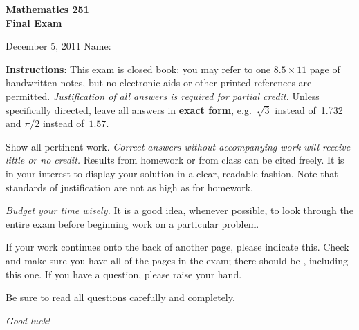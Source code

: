 \documentclass[12pt]{exam}
\begin{document}
\addpoints

\noindent
\textbf{{\large Mathematics 251 \\ Final Exam}}

\noindent
December 5, 2011  \hfill Name: \underline{\hspace{3in}}

\noindent
\textbf{Instructions}: This exam is closed book: you may refer to one $8.5 \times 11$ page of handwritten notes, but no electronic aids or
other printed references are permitted. \emph{Justification of all answers is required
for partial credit.} Unless
specifically directed, leave all answers in \textbf{exact form}, e.g.\
$\sqrt{3}$ instead of~1.732 and $\pi/2$ instead of~$1.57$.

Show all pertinent work. \emph{Correct answers without accompanying work will receive little or no credit.} Results from homework or from class can be cited freely. It is in your interest to display your solution in a
clear, readable fashion. Note that standards of justification are not as high as for homework.

\emph{Budget your time wisely.} It is a good idea, whenever possible, to look through the entire exam before beginning work on a particular problem.

If your work continues onto the back of another page, please indicate
this. Check and make sure you have all of the pages in the
exam; there should be \numpages, including this one. If you have a
question, please raise your hand.

Be sure to read all questions carefully and completely.

\vspace*{1.0in}

\begin{center}
\combinedgradetable[h]
\end{center}

\vspace*{0.5in}

\begin{center}
{\Large \emph{Good luck!}}
\end{center}

\newpage
\end{document}
